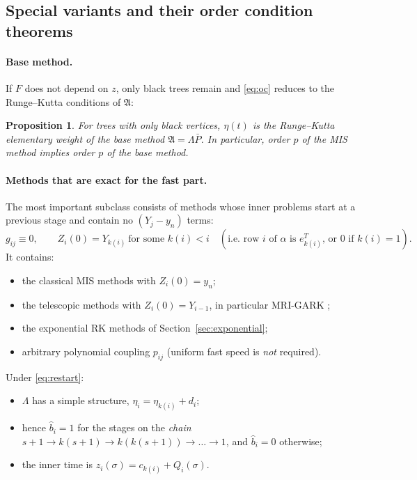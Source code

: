 \documentclass[11pt,a4paper]{article}
\newtheorem{proposition}[theorem]{Proposition}
\theoremstyle{definition}
\theoremstyle{remark}
\begin{document}
\subsection{Special variants and their order condition theorems}
\label{sec:specialtheorems}

\paragraph{Base method.}
If $F$ does not depend on $z$, only black trees remain and
\eqref{eq:oc} reduces to the Runge--Kutta conditions of $\mathfrak A$:

\begin{proposition}\label{prop:base}
For trees with only black vertices, $\eta(t)$ is the Runge--Kutta
elementary weight of the base method $\mathfrak A=\Lambda\bar P$. In
particular, order $p$ of the MIS method implies order $p$ of the base
method.
\end{proposition}

\paragraph{Methods that are exact for the fast part.}
The most important subclass consists of methods whose inner problems
start at a previous stage and contain no $(Y_j-y_n)$ terms:
\begin{equation}\label{eq:restart}
 g_{ij}\equiv0,\qquad Z_i(0)=Y_{k(i)}\ \text{for some }k(i)<i
 \quad(\text{i.e.\ row $i$ of $\alpha$ is $e_{k(i)}^T$, or $0$ if $k(i)=1$}).
\end{equation}
It contains:
\begin{itemize}
\item the classical MIS methods with $Z_i(0)=y_n$;
\item the telescopic methods with $Z_i(0)=Y_{i-1}$, in particular
  MRI-GARK \cite{Sandu2019};
\item the exponential RK methods of Section~\ref{sec:exponential};
\item arbitrary polynomial coupling $p_{ij}$ (uniform fast speed is
  \emph{not} required).
\end{itemize}
Under \eqref{eq:restart}:
\begin{itemize}
\item $\Lambda$ has a simple structure, $\eta_i=\eta_{k(i)}+d_i$;
\item hence $\hat b_i=1$ for the stages on the \emph{chain}
  $s+1\to k(s+1)\to k(k(s+1))\to\dots\to1$, and $\hat b_i=0$ otherwise;
\item the inner time is $z_i(\sigma)=c_{k(i)}+Q_i(\sigma)$.
\end{itemize}
\end{document}
